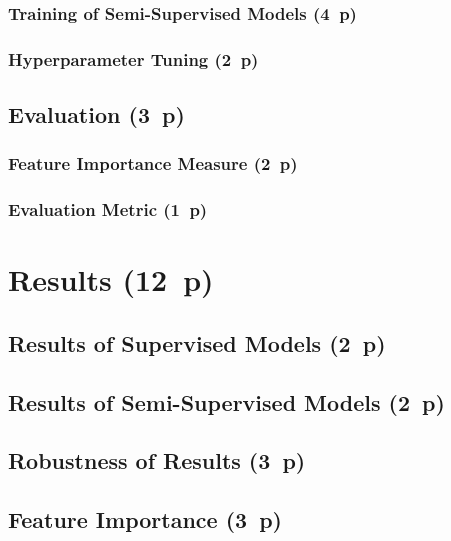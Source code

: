 \subsubsection{Training of Semi-Supervised
  Models (4~p)}\label{sec:training-of-semi-supervised-models}


\subsubsection{Hyperparameter Tuning (2~p)}\label{sec:hyperparameter-tuning}


\subsection{Evaluation (3~p)}\label{sec:evaluation}

\subsubsection{Feature Importance
  Measure (2~p)}\label{sec:feature-importance-measure}

\subsubsection{Evaluation Metric (1~p)}\label{sec:evaluation-metric}

\newpage
\section{Results (12~p)}\label{sec:results}

\subsection{Results of Supervised
  Models (2~p)}\label{sec:results-of-supervised-models}

\subsection{Results of Semi-Supervised
  Models (2~p)}\label{sec:results-of-semi-supervised-models}

\subsection{Robustness of Results (3~p)}\label{sec:robustness-checks}

\subsection{Feature Importance (3~p)}\label{sec:feature-importance}

